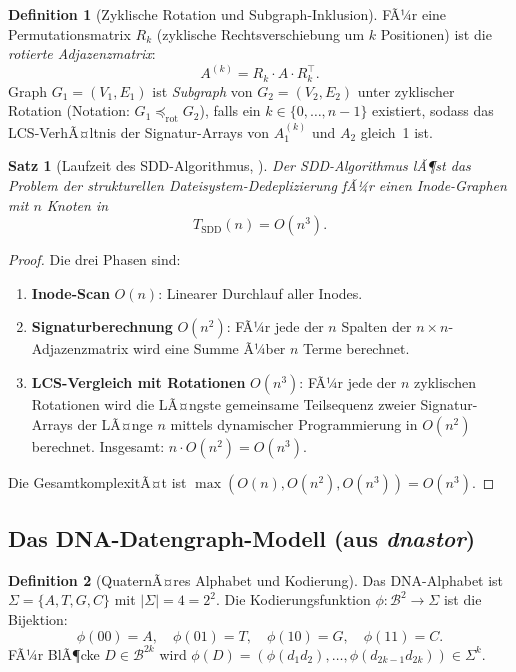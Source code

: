 ﻿\documentclass[a4paper,12pt]{article}
\theoremstyle{definition}
\newtheorem{definition}{Definition}[section]
\theoremstyle{plain}
\newtheorem{satz}{Satz}[section]
\begin{document}
\begin{definition}[Zyklische Rotation und Subgraph-Inklusion]
\label{def:rotation}
  FÃ¼r eine Permutationsmatrix $R_k$ (zyklische Rechtsverschiebung um $k$
  Positionen) ist die \emph{rotierte Adjazenzmatrix}:
  \[
    A^{(k)} = R_k \cdot A \cdot R_k^\top.
  \]
  Graph $G_1 = (V_1, E_1)$ ist \emph{Subgraph} von $G_2 = (V_2, E_2)$
  unter zyklischer Rotation (Notation: $G_1 \preceq_{\mathrm{rot}} G_2$),
  falls ein $k \in \{0, \ldots, n-1\}$ existiert, sodass das
  LCS-VerhÃ¤ltnis der Signatur-Arrays von $A_1^{(k)}$ und $A_2$ gleich~1
  ist.
\end{definition}

\begin{satz}[Laufzeit des SDD-Algorithmus, \cite{dusgraph}]
\label{satz:sdd_laufzeit}
  Der SDD-Algorithmus lÃ¶st das Problem der strukturellen Dateisystem-Dede\-pli\-zie\-rung
  fÃ¼r einen Inode-Graphen mit $n$ Knoten in
  \[
    T_{\mathrm{SDD}}(n) = O(n^3).
  \]
\end{satz}

\begin{proof}
  Die drei Phasen sind:
  \begin{enumerate}
    \item \textbf{Inode-Scan} $O(n)$: Linearer Durchlauf aller Inodes.
    \item \textbf{Signaturberechnung} $O(n^2)$: FÃ¼r jede der $n$ Spalten
          der $n \times n$-Adjazenzmatrix wird eine Summe Ã¼ber $n$ Terme
          berechnet.
    \item \textbf{LCS-Vergleich mit Rotationen} $O(n^3)$: FÃ¼r jede der $n$
          zyklischen Rotationen wird die LÃ¤ngste gemeinsame Teilsequenz zweier
          Signatur-Arrays der LÃ¤nge $n$ mittels dynamischer Programmierung in
          $O(n^2)$ berechnet. Insgesamt: $n \cdot O(n^2) = O(n^3)$.
  \end{enumerate}
  Die GesamtkomplexitÃ¤t ist $\max(O(n), O(n^2), O(n^3)) = O(n^3)$. 
\end{proof}

\subsection{Das DNA-Datengraph-Modell (aus \texorpdfstring{\textit{dnastor}}{dnastor})}
\label{ssec:dna_modell}

\begin{definition}[QuaternÃ¤res Alphabet und Kodierung]
\label{def:phi}
  Das DNA-Alphabet ist $\Sigma = \{A, T, G, C\}$ mit
  $|\Sigma| = 4 = 2^2$.  Die Kodierungsfunktion
  $\phi: \mathcal{B}^2 \to \Sigma$ ist die Bijektion:
  \[
    \phi(00) = A, \quad \phi(01) = T, \quad
    \phi(10) = G, \quad \phi(11) = C.
  \]
  FÃ¼r BlÃ¶cke $D \in \mathcal{B}^{2k}$ wird
  $\phi(D) = (\phi(d_1 d_2), \ldots, \phi(d_{2k-1} d_{2k})) \in \Sigma^k$.
\end{definition}
\end{document}
